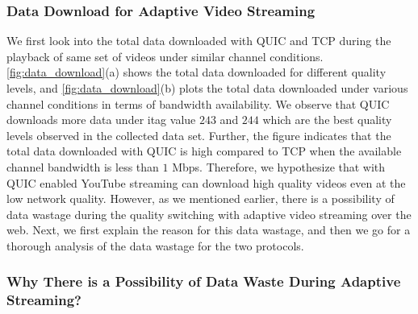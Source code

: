 \subsubsection{Data Download for Adaptive Video Streaming}
We first look into the total data downloaded with QUIC and TCP during the playback of same set of videos under similar channel conditions. \fig\ref{fig:data_download}(a) shows the total data downloaded for different quality levels, and \fig\ref{fig:data_download}(b) plots the total data downloaded under various channel conditions in terms of bandwidth availability. We observe that QUIC downloads more data under itag value $243$ and $244$ which are the best quality levels observed in the collected data set. 
Further, the figure indicates that the total data downloaded with QUIC is high compared to TCP when the available channel bandwidth is less than $1$ Mbps. Therefore, we hypothesize that with QUIC enabled YouTube streaming can download high quality videos even at the low network quality. 
However, as we mentioned earlier, there is a possibility of data wastage during the quality switching with adaptive video streaming over the web. Next, we first explain the reason for this data wastage, and then we go for a thorough analysis of the data wastage for the two protocols. 





\subsubsection{Why There is a Possibility of Data Waste During Adaptive Streaming?}


